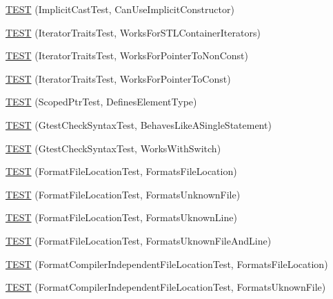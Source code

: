 \begin{DoxyCompactItemize}
\item 
\mbox{\hyperlink{namespacetesting_1_1internal_ad5c2cf37cc5aa78744012255cae78f9b}{T\+E\+ST}} (Implicit\+Cast\+Test, Can\+Use\+Implicit\+Constructor)
\item 
\mbox{\hyperlink{namespacetesting_1_1internal_abd56ca990c5b8c1aea44d15028a74f33}{T\+E\+ST}} (Iterator\+Traits\+Test, Works\+For\+S\+T\+L\+Container\+Iterators)
\item 
\mbox{\hyperlink{namespacetesting_1_1internal_a642234d85836450bb8795cf0a8a9f908}{T\+E\+ST}} (Iterator\+Traits\+Test, Works\+For\+Pointer\+To\+Non\+Const)
\item 
\mbox{\hyperlink{namespacetesting_1_1internal_afc0e95a0472d243967fd4720c681c478}{T\+E\+ST}} (Iterator\+Traits\+Test, Works\+For\+Pointer\+To\+Const)
\item 
\mbox{\hyperlink{namespacetesting_1_1internal_a99f56e2e9d5b30a879f877cc72bb0c0c}{T\+E\+ST}} (Scoped\+Ptr\+Test, Defines\+Element\+Type)
\item 
\mbox{\hyperlink{namespacetesting_1_1internal_a26d00130a017a66d0d60dc5a02a13d25}{T\+E\+ST}} (Gtest\+Check\+Syntax\+Test, Behaves\+Like\+A\+Single\+Statement)
\item 
\mbox{\hyperlink{namespacetesting_1_1internal_a4dfd147ff396984fca799878cb53dcea}{T\+E\+ST}} (Gtest\+Check\+Syntax\+Test, Works\+With\+Switch)
\item 
\mbox{\hyperlink{namespacetesting_1_1internal_a1a1c20d78e9e75b9c7f2b767eb62611b}{T\+E\+ST}} (Format\+File\+Location\+Test, Formats\+File\+Location)
\item 
\mbox{\hyperlink{namespacetesting_1_1internal_ace2f5407afdfb0767035d44b6758e4a0}{T\+E\+ST}} (Format\+File\+Location\+Test, Formats\+Unknown\+File)
\item 
\mbox{\hyperlink{namespacetesting_1_1internal_a17d1f472b6c1154de7b5b008b964ee32}{T\+E\+ST}} (Format\+File\+Location\+Test, Formats\+Uknown\+Line)
\item 
\mbox{\hyperlink{namespacetesting_1_1internal_a1195aaf7258c5442de7aebd95acefb9f}{T\+E\+ST}} (Format\+File\+Location\+Test, Formats\+Uknown\+File\+And\+Line)
\item 
\mbox{\hyperlink{namespacetesting_1_1internal_a9c12f8c1ebb19906e8fa0c430d139076}{T\+E\+ST}} (Format\+Compiler\+Independent\+File\+Location\+Test, Formats\+File\+Location)
\item 
\mbox{\hyperlink{namespacetesting_1_1internal_a65ad1cad17717c1b8ac4c2d4bef5e079}{T\+E\+ST}} (Format\+Compiler\+Independent\+File\+Location\+Test, Formats\+Uknown\+File)
\item 

\end{DoxyCompactItemize}
